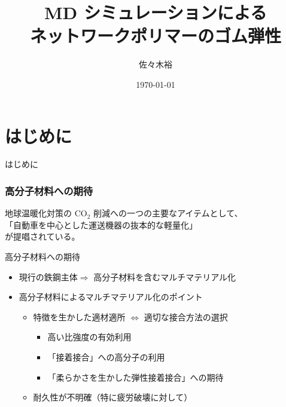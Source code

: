 \documentclass[11pt, dvipdfmx]{beamer}
\title
[MD シミュレーションによるゴム弾性]
{MD シミュレーションによる\\ネットワークポリマーのゴム弾性}
\author{佐々木裕}
\institute[東亞合成]{東亞合成}
\date{\today}
\begin{document}
\begin{frame}\frametitle{}
	\titlepage
\end{frame}



\section{はじめに}
\begin{frame}
\LARGE{はじめに}
\end{frame}

%
%
%
%

\begin{frame}
\frametitle{高分子材料への期待}

地球温暖化対策の CO$_2$ 削減への一つの主要なアイテムとして、\\
{\Large
\alert{「自動車を中心とした運送機器の抜本的な軽量化」}
}\\
が提唱されている。
\begin{block}{高分子材料への期待}
	\begin{itemize}
	\item
	現行の鉄鋼主体$ \Rightarrow$ 高分子材料を含むマルチマテリアル化
	
	\item
	高分子材料によるマルチマテリアル化のポイント
		\begin{itemize}
		\item
		\alert{\large 特徴を生かした適材適所 $\Leftrightarrow$ 適切な接合方法の選択}
			\begin{itemize}
			\item
			{\normalsize 高い比強度の有効利用}
			\item
			{\normalsize「接着接合」への高分子の利用}
			\item
			{\normalsize「柔らかさを生かした弾性接着接合」への期待}
			\end{itemize}
		\item
		{\color{blue}\large 耐久性が不明確（特に疲労破壊に対して）}
		\end{itemize}
	\end{itemize}
\end{block}
\end{frame}
\end{document}
